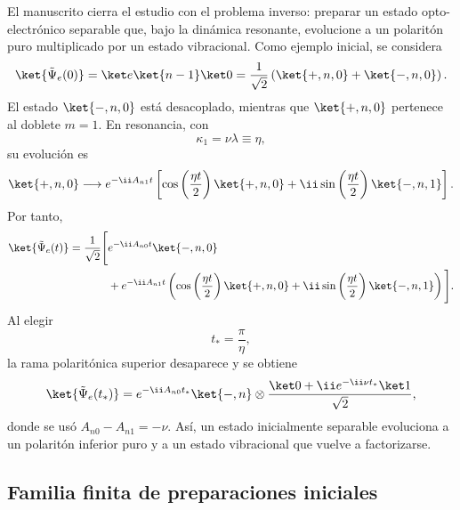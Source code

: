 El manuscrito cierra el estudio con el problema inverso: preparar un estado
opto-electr\'onico separable que, bajo la din\'amica resonante, evolucione a un
polarit\'on puro multiplicado por un estado vibracional. Como ejemplo inicial,
se considera
\begin{equation}
  \ket{\tilde\Psi_e(0)}
  =
  \ket e\ket{n-1}\ket 0
  =
  \frac{1}{\sqrt2}
  \left(
  \ket{+,n,0}+\ket{-,n,0}
  \right).
\end{equation}
El estado $\ket{-,n,0}$ est\'a desacoplado, mientras que $\ket{+,n,0}$
pertenece al doblete $m=1$. En resonancia, con
\begin{equation}
  \kappa_1=\nu\lambda\equiv\eta,
\end{equation}
su evoluci\'on es
\begin{equation}
  \ket{+,n,0}
  \longrightarrow
  e^{-\ii A_{n1}t}
  \left[
  \cos\left(\frac{\eta t}{2}\right)\ket{+,n,0}
  +\ii\sin\left(\frac{\eta t}{2}\right)\ket{-,n,1}
  \right].
\end{equation}
Por tanto,
\begin{equation}
\begin{aligned}
  \ket{\tilde\Psi_e(t)}
  =\frac{1}{\sqrt2}\Bigg[&
  e^{-\ii A_{n0}t}\ket{-,n,0}
  \\
  &+e^{-\ii A_{n1}t}
  \left(
  \cos\left(\frac{\eta t}{2}\right)\ket{+,n,0}
  +\ii\sin\left(\frac{\eta t}{2}\right)\ket{-,n,1}
  \right)
  \Bigg].
\end{aligned}
\end{equation}
Al elegir
\begin{equation}
  t_*=\frac{\pi}{\eta},
\end{equation}
la rama polarit\'onica superior desaparece y se obtiene
\begin{equation}
  \ket{\tilde\Psi_e(t_*)}
  =
  e^{-\ii A_{n0}t_*}\ket{-,n}
  \otimes
  \frac{\ket 0+\ii e^{-\ii\nu t_*}\ket 1}{\sqrt2},
\end{equation}
donde se us\'o $A_{n0}-A_{n1}=-\nu$. As\'i, un estado inicialmente separable
evoluciona a un polarit\'on inferior puro y a un estado vibracional que vuelve
a factorizarse.

\subsection{Familia finita de preparaciones iniciales}

